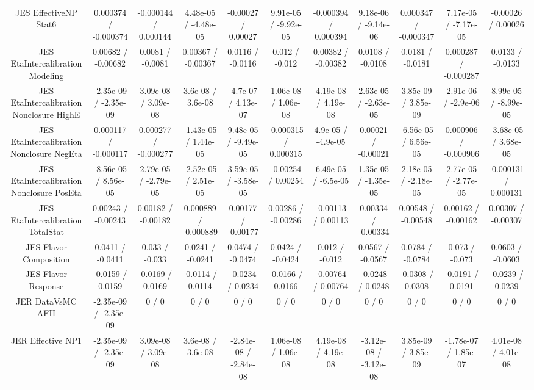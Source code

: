 \begin{table}[htbp]
\begin{center}
\begin{tabular}{|c|c|c|c|c|c|c|c|c|c|c|}
  JES EffectiveNP Stat6 & 0.000374 / -0.000374 & -0.000144 / 0.000144 & 4.48e-05 / -4.48e-05 & -0.00027 / 0.00027 & 9.91e-05 / -9.92e-05 & -0.000394 / 0.000394 & 9.18e-06 / -9.14e-06 & 0.000347 / -0.000347 & 7.17e-05 / -7.17e-05 & -0.00026 / 0.00026 \\ 
  JES EtaIntercalibration Modeling & 0.00682 / -0.00682 & 0.0081 / -0.0081 & 0.00367 / -0.00367 & 0.0116 / -0.0116 & 0.012 / -0.012 & 0.00382 / -0.00382 & 0.0108 / -0.0108 & 0.0181 / -0.0181 & 0.000287 / -0.000287 & 0.0133 / -0.0133 \\ 
  JES EtaIntercalibration Nonclosure HighE & -2.35e-09 / -2.35e-09 & 3.09e-08 / 3.09e-08 & 3.6e-08 / 3.6e-08 & -4.7e-07 / 4.13e-07 & 1.06e-08 / 1.06e-08 & 4.19e-08 / 4.19e-08 & 2.63e-05 / -2.63e-05 & 3.85e-09 / 3.85e-09 & 2.91e-06 / -2.9e-06 & 8.99e-05 / -8.99e-05 \\ 
  JES EtaIntercalibration Nonclosure NegEta & 0.000117 / -0.000117 & 0.000277 / -0.000277 & -1.43e-05 / 1.44e-05 & 9.48e-05 / -9.49e-05 & -0.000315 / 0.000315 & 4.9e-05 / -4.9e-05 & 0.00021 / -0.00021 & -6.56e-05 / 6.56e-05 & 0.000906 / -0.000906 & -3.68e-05 / 3.68e-05 \\ 
  JES EtaIntercalibration Nonclosure PosEta & -8.56e-05 / 8.56e-05 & 2.79e-05 / -2.79e-05 & -2.52e-05 / 2.51e-05 & 3.59e-05 / -3.58e-05 & -0.00254 / 0.00254 & 6.49e-05 / -6.5e-05 & 1.35e-05 / -1.35e-05 & 2.18e-05 / -2.18e-05 & 2.77e-05 / -2.77e-05 & -0.000131 / 0.000131 \\ 
  JES EtaIntercalibration TotalStat & 0.00243 / -0.00243 & 0.00182 / -0.00182 & 0.000889 / -0.000889 & 0.00177 / -0.00177 & 0.00286 / -0.00286 & -0.00113 / 0.00113 & 0.00334 / -0.00334 & 0.00548 / -0.00548 & 0.00162 / -0.00162 & 0.00307 / -0.00307 \\ 
  JES Flavor Composition & 0.0411 / -0.0411 & 0.033 / -0.033 & 0.0241 / -0.0241 & 0.0474 / -0.0474 & 0.0424 / -0.0424 & 0.012 / -0.012 & 0.0567 / -0.0567 & 0.0784 / -0.0784 & 0.073 / -0.073 & 0.0603 / -0.0603 \\ 
  JES Flavor Response & -0.0159 / 0.0159 & -0.0169 / 0.0169 & -0.0114 / 0.0114 & -0.0234 / 0.0234 & -0.0166 / 0.0166 & -0.00764 / 0.00764 & -0.0248 / 0.0248 & -0.0308 / 0.0308 & -0.0191 / 0.0191 & -0.0239 / 0.0239 \\ 
  JER DataVsMC AFII & -2.35e-09 / -2.35e-09 & 0 / 0 & 0 / 0 & 0 / 0 & 0 / 0 & 0 / 0 & 0 / 0 & 0 / 0 & 0 / 0 & 0 / 0 \\ 
  JER Effective NP1 & -2.35e-09 / -2.35e-09 & 3.09e-08 / 3.09e-08 & 3.6e-08 / 3.6e-08 & -2.84e-08 / -2.84e-08 & 1.06e-08 / 1.06e-08 & 4.19e-08 / 4.19e-08 & -3.12e-08 / -3.12e-08 & 3.85e-09 / 3.85e-09 & -1.78e-07 / 1.85e-07 & 4.01e-08 / 4.01e-08 \\ 

\end{tabular}
\end{center}
\end{table}
